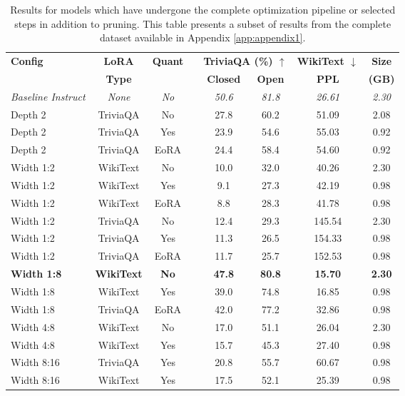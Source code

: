 {\footnotesize
\begin{table}[htbp]
\centering
\footnotesize
\caption[Results for Complete Pipeline Configurations (Subset)]{Results for models which have undergone the complete optimization pipeline or selected steps in addition to pruning. This table presents a subset of results from the complete dataset available in Appendix \ref{app:appendix1}.} \label{tab:complete_pipeline_results}
\begin{tabular}{lcclcccc}
\hline
\textbf{Config} & \textbf{LoRA} & \textbf{Quant} & & \multicolumn{2}{c}{\textbf{TriviaQA (\%) $\uparrow$}} & \textbf{WikiText $\downarrow$} & \textbf{Size} \\
\cline{5-6}
& \textbf{Type} & & & \textbf{Closed} & \textbf{Open} & \textbf{PPL} & \textbf{(GB)} \\
\hline
\textit{Baseline Instruct} & \textit{None} & \textit{No} & & \textit{50.6} & \textit{81.8} & \textit{26.61} & \textit{2.30} \\
Depth 2 & TriviaQA & No & & 27.8 & 60.2 & 51.09 & 2.08 \\
Depth 2 & TriviaQA & Yes & & 23.9 & 54.6 & 55.03 & 0.92 \\
Depth 2 & TriviaQA & EoRA & & 24.4 & 58.4 & 54.60 & 0.92 \\
Width 1:2 & WikiText & No & & 10.0 & 32.0 & 40.26 & 2.30 \\
Width 1:2 & WikiText & Yes & & 9.1 & 27.3 & 42.19 & 0.98 \\
Width 1:2 & WikiText & EoRA & & 8.8 & 28.3 & 41.78 & 0.98 \\
Width 1:2 & TriviaQA & No & & 12.4 & 29.3 & 145.54 & 2.30 \\
Width 1:2 & TriviaQA & Yes & & 11.3 & 26.5 & 154.33 & 0.98 \\
Width 1:2 & TriviaQA & EoRA & & 11.7 & 25.7 & 152.53 & 0.98 \\
\textbf{Width 1:8} & \textbf{WikiText} & \textbf{No} & & \textbf{47.8} & \textbf{80.8} & \textbf{15.70} & \textbf{2.30} \\
Width 1:8 & WikiText & Yes & & 39.0 & 74.8 & 16.85 & 0.98 \\
Width 1:8 & TriviaQA & EoRA & & 42.0 & 77.2 & 32.86 & 0.98 \\
Width 4:8 & WikiText & No & & 17.0 & 51.1 & 26.04 & 2.30 \\
Width 4:8 & WikiText & Yes & & 15.7 & 45.3 & 27.40 & 0.98 \\
Width 8:16 & TriviaQA & Yes & & 20.8 & 55.7 & 60.67 & 0.98 \\
Width 8:16 & WikiText & Yes & & 17.5 & 52.1 & 25.39 & 0.98 \\

\end{tabular}
\end{table}}
